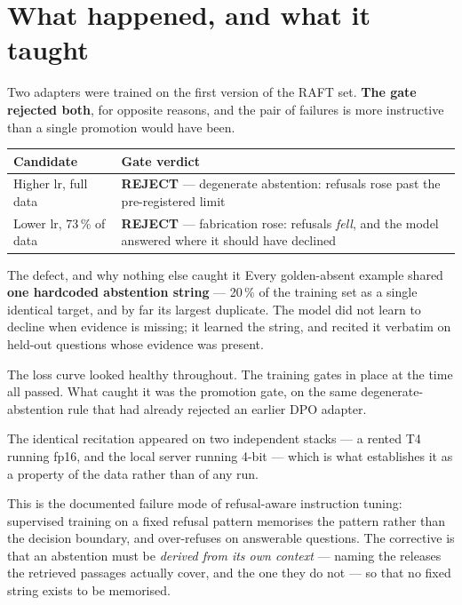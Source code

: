 \documentclass[11pt,a4paper]{article}
\begin{document}
\section{What happened, and what it taught}

Two adapters were trained on the first version of the RAFT set. \textbf{The gate
rejected both}, for opposite reasons, and the pair of failures is more instructive
than a single promotion would have been.

\begin{table}[h]\centering\small
\begin{tabularx}{\textwidth}{l Y}
\toprule
\textbf{Candidate} & \textbf{Gate verdict} \\
\midrule
Higher lr, full data & \textbf{REJECT} --- degenerate abstention: refusals rose past
the pre-registered limit \\
 Lower lr, 73\,\% of data & \textbf{REJECT} --- fabrication rose:
refusals \emph{fell}, and the model answered where it should have declined \\
\bottomrule
\end{tabularx}
\end{table}

\begin{warnbox}{{The defect, and why nothing else caught it}}
Every golden-absent example shared \textbf{one hardcoded abstention string} --- 20\,\%
of the training set as a single identical target, and by far its largest duplicate.
The model did not learn to decline when evidence is missing; it learned the string,
and recited it verbatim on held-out questions whose evidence was present.

The loss curve looked healthy throughout. The training gates in place at the time
all passed. What caught it was the promotion gate, on the same
degenerate-abstention rule that had already rejected an earlier DPO adapter.

The identical recitation appeared on two independent stacks --- a rented T4 running
fp16, and the local server running 4-bit --- which is what establishes it as a
property of the data rather than of any run.
\end{warnbox}

This is the documented failure mode of refusal-aware instruction tuning: supervised
training on a fixed refusal pattern memorises the pattern rather than the decision
boundary, and over-refuses on answerable questions. The corrective is that an
abstention must be \emph{derived from its own context} --- naming the releases the
retrieved passages actually cover, and the one they do not --- so that no fixed
string exists to be memorised.
\end{document}
